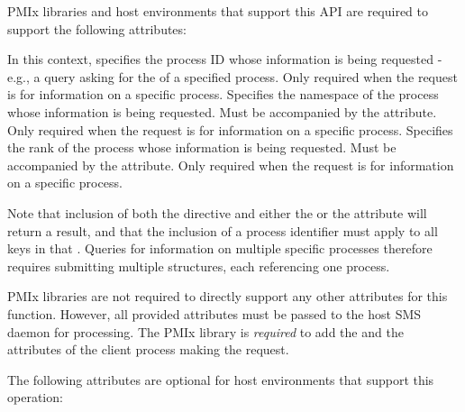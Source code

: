 \reqattrstart
\ac{PMIx} libraries and host environments that support this \ac{API} are required to support the following attributes:

In this context, specifies the process ID whose information is being requested - e.g., a query asking for the  of a specified process. Only required when the request is for information on a specific process.
\pasteAttributeItemEnd
{}Specifies the namespace of the process whose information is being requested. Must be accompanied by the  attribute. Only required when the request is for information on a specific process.
\pasteAttributeItemEnd
{}Specifies the rank of the process whose information is being requested. Must be accompanied by the  attribute. Only required when the request is for information on a specific process.
\pasteAttributeItemEnd
{}

Note that inclusion of both the  directive and either the  or the  attribute will return a  result, and that the inclusion of a process identifier must apply to all keys in that . Queries for information on multiple specific processes therefore requires submitting multiple  structures, each referencing one process.

\ac{PMIx} libraries are not required to directly support any other attributes for this function. However, all provided attributes must be passed to the host \ac{SMS} daemon for processing. The \ac{PMIx} library is \textit{required} to add the  and the  attributes of the client process making the request.

\reqattrend

\optattrstart
The following attributes are optional for host environments that support this operation:

